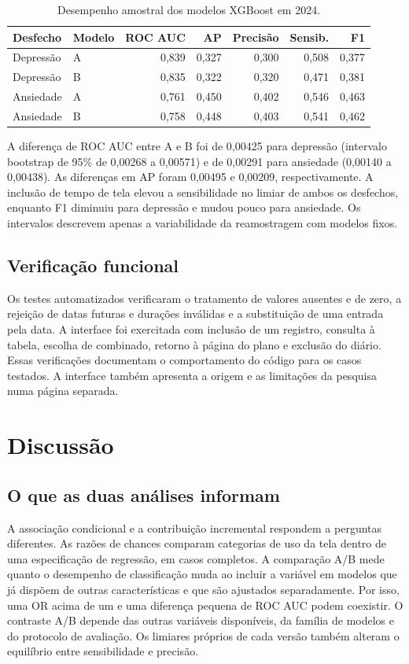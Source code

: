 ﻿\documentclass[12pt]{article}
\begin{document}
\begin{table}[htbp]
\centering
\caption{Desempenho amostral dos modelos XGBoost em 2024.}
\label{tab:predicao}
\begin{tabular}{llrrrrr}\hline
Desfecho & Modelo & ROC AUC & AP & Precisão & Sensib. & F1 \\\hline
Depressão & A & 0,839 & 0,327 & 0,300 & 0,508 & 0,377 \\
Depressão & B & 0,835 & 0,322 & 0,320 & 0,471 & 0,381 \\
Ansiedade & A & 0,761 & 0,450 & 0,402 & 0,546 & 0,463 \\
Ansiedade & B & 0,758 & 0,448 & 0,403 & 0,541 & 0,462 \\\hline
\end{tabular}

\end{table}

A diferença de ROC AUC entre A e B foi de 0,00425 para depressão (intervalo bootstrap de 95\% de 0,00268 a 0,00571) e de 0,00291 para ansiedade (0,00140 a 0,00438). As diferenças em AP foram 0,00495 e 0,00209, respectivamente. A inclusão de tempo de tela elevou a sensibilidade no limiar de ambos os desfechos, enquanto F1 diminuiu para depressão e mudou pouco para ansiedade. Os intervalos descrevem apenas a variabilidade da reamostragem com modelos fixos.

\subsection{Verificação funcional}
Os testes automatizados verificaram o tratamento de valores ausentes e de zero, a rejeição de datas futuras e durações inválidas e a substituição de uma entrada pela data. A interface foi exercitada com inclusão de um registro, consulta à tabela, escolha de combinado, retorno à página do plano e exclusão do diário. Essas verificações documentam o comportamento do código para os casos testados. A interface também apresenta a origem e as limitações da pesquisa numa página separada.

\section{Discussão}
\subsection{O que as duas análises informam}
A associação condicional e a contribuição incremental respondem a perguntas diferentes. As razões de chances comparam categorias de uso da tela dentro de uma especificação de regressão, em casos completos. A comparação A/B mede quanto o desempenho de classificação muda ao incluir a variável em modelos que já dispõem de outras características e que são ajustados separadamente. Por isso, uma OR acima de um e uma diferença pequena de ROC AUC podem coexistir. O contraste A/B depende das outras variáveis disponíveis, da família de modelos e do protocolo de avaliação. Os limiares próprios de cada versão também alteram o equilíbrio entre sensibilidade e precisão.
\end{document}
